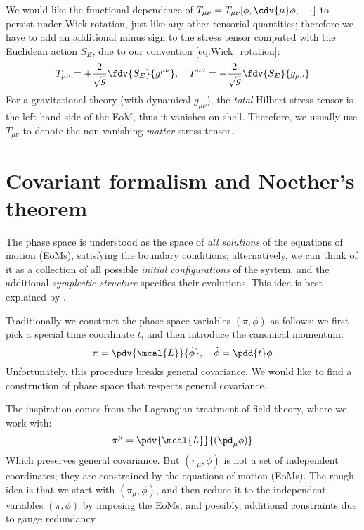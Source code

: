 \documentclass[a4paper
	,10pt
]{article}
\begin{document}
\begin{itemize}
	We would like the functional dependence of $
		T_{\mu\nu}
		= T_{\mu\nu}[\phi,\cdv{\mu} \phi,\cdots]
	$ to persist under Wick rotation, just like any other tensorial quantities; therefore we have to add an additional minus sign to the stress tensor computed with the Euclidean action $S_E$, due to our convention \eqref{eq:Wick_rotation}:
	\begin{equation}
		T_{\mu\nu}
		= + \frac{2}{\sqrt{g}}
			\fdv{S_E}{g^{\mu\nu}},
	\quad
		T^{\mu\nu}
		= - \frac{2}{\sqrt{g}}
			\fdv{S_E}{g_{\mu\nu}}
	\end{equation}
	For a gravitational theory (with dynamical $g_{\mu\nu}$), the \textit{total} Hilbert stress tensor is the left-hand side of the EoM, thus it vanishes on-shell. Therefore, we usually use $T_{\mu\nu}$ to denote the non-vanishing \textit{matter} stress tensor. 
	
	\end{itemize}
	
\pagebreak[4]
\section{Covariant formalism and Noether's theorem}
	The phase space is understood as the space of \textit{all solutions} of the equations of motion (EoMs), satisfying the boundary conditions; alternatively, we can think of it as a collection of all possible \textit{initial configurations} of the system, and the additional \textit{symplectic structure} specifies their evolutions. This idea is best explained by \textcite{Crnkovic:1986ex}. 
	
	Traditionally we construct the phase space variables $(\pi,\phi)$ as follows: we first pick a special time coordinate $t$, and then introduce the canonical momentum:
	\begin{equation}
		\pi = \pdv{\mcal{L}}{\dot{\phi}},
	\quad
		\dot{\phi} = \pdd{t} \phi
	\end{equation}
	Unfortunately, this procedure breaks general covariance. We would like to find a construction of phase space that respects general covariance. 
	
	The inspiration comes from the Lagrangian treatment of field theory, where we work with:
	\begin{equation}
		\pi^\mu = \pdv{\mcal{L}}{(\pd_\mu\phi)}
	\end{equation}
	Which preserves general covariance. But $(\pi_\mu,\phi)$ is not a set of independent coordinates; they are constrained by the equations of motion (EoMs). The rough idea is that we start with $(\pi_\mu,\phi)$, and then reduce it to the independent variables $(\pi,\phi)$ by imposing the EoMs, and possibly, additional constraints due to gauge redundancy. 
\end{document}
